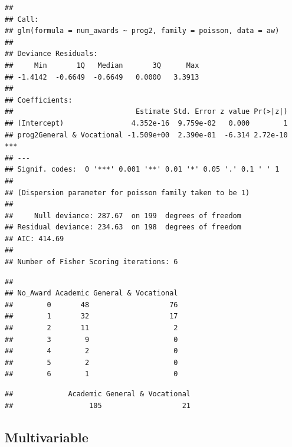 \documentclass[
]{book}
\makeatletter
\newenvironment{Shaded}{\begin{snugshade}}{\end{snugshade}}
\newcommand{\AttributeTok}[1]{\textcolor[rgb]{0.61,0.61,0.61}{#1}}
\newcommand{\FunctionTok}[1]{\textcolor[rgb]{0,0,0}{#1}}
\newcommand{\NormalTok}[1]{#1}
\newcommand{\SpecialCharTok}[1]{\textcolor[rgb]{0,0,0}{#1}}
\newenvironment{kframe}{%
\medskip{}
\setlength{\fboxsep}{.8em}
 \def\at@end@of@kframe{}%
 \ifinner\ifhmode%
  \def\at@end@of@kframe{\end{minipage}}%
  \begin{minipage}{\columnwidth}%
 \fi\fi%
 \def\FrameCommand##1{\hskip\@totalleftmargin \hskip-\fboxsep
 \colorbox{shadecolor}{##1}\hskip-\fboxsep
     \hskip-\linewidth \hskip-\@totalleftmargin \hskip\columnwidth}%
 \MakeFramed {\advance\hsize-\width
   \@totalleftmargin\z@ \linewidth\hsize
   \@setminipage}}%
 {\par\unskip\endMakeFramed%
 \at@end@of@kframe}
\renewenvironment{Shaded}{\begin{kframe}}{\end{kframe}}
\makeatother
\begin{document}
\begin{verbatim}
## 
## Call:
## glm(formula = num_awards ~ prog2, family = poisson, data = aw)
## 
## Deviance Residuals: 
##     Min       1Q   Median       3Q      Max  
## -1.4142  -0.6649  -0.6649   0.0000   3.3913  
## 
## Coefficients:
##                             Estimate Std. Error z value Pr(>|z|)    
## (Intercept)                4.352e-16  9.759e-02   0.000        1    
## prog2General & Vocational -1.509e+00  2.390e-01  -6.314 2.72e-10 ***
## ---
## Signif. codes:  0 '***' 0.001 '**' 0.01 '*' 0.05 '.' 0.1 ' ' 1
## 
## (Dispersion parameter for poisson family taken to be 1)
## 
##     Null deviance: 287.67  on 199  degrees of freedom
## Residual deviance: 234.63  on 198  degrees of freedom
## AIC: 414.69
## 
## Number of Fisher Scoring iterations: 6
\end{verbatim}

\begin{Shaded}
\end{Shaded}

\begin{verbatim}
##         
## No_Award Academic General & Vocational
##        0       48                   76
##        1       32                   17
##        2       11                    2
##        3        9                    0
##        4        2                    0
##        5        2                    0
##        6        1                    0
\end{verbatim}

\begin{Shaded}
\end{Shaded}

\begin{verbatim}
##             Academic General & Vocational 
##                  105                   21
\end{verbatim}

\hypertarget{multivariable-1}{%
\subsection{Multivariable}\label{multivariable-1}}
\end{document}

